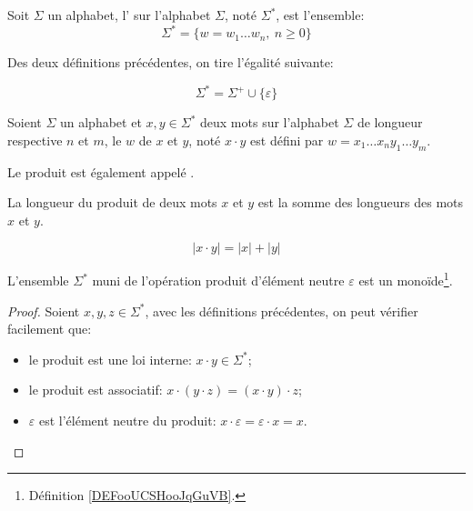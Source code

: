 \begin{definition}
	Soit \( \Sigma \) un alphabet, l' sur l'alphabet \( \Sigma \), noté \( \Sigma^* \), est l'ensemble:
	\begin{equation}
		\Sigma^* = \{ w = w_1 \ldots w_n,~ n \geq 0 \}
	\end{equation}
\end{definition}

Des deux définitions précédentes, on tire l'égalité suivante:

\begin{equation}
	\Sigma^* = \Sigma^+ \cup \{ \varepsilon \}
\end{equation}

\begin{definition}
	Soient \( \Sigma \) un alphabet et \( x, y \in \Sigma^* \) deux mots sur l'alphabet \( \Sigma \) de longueur respective \( n \) et \( m \), le  \( w \) de \( x \) et \( y \), noté \( x \cdot y \) est défini par \( w = x_1 \ldots x_n y_1 \ldots y_m \).
\end{definition}

Le produit est également appelé .

\begin{proposition}

	La longueur du produit de deux mots \( x \) et \( y \) est la somme des longueurs des mots \( x \) et \( y \).

	\begin{equation}
		|x \cdot y| = |x| + |y|
	\end{equation}
\end{proposition}


\begin{proposition}
	L'ensemble \( \Sigma^* \) muni de l'opération produit d'élément neutre \( \varepsilon \) est un monoïde\footnote{Définition \ref{DEFooUCSHooJqGuVB}.}.
\end{proposition}

\begin{proof}
	Soient \( x, y, z \in \Sigma^* \), avec les définitions précédentes, on peut vérifier facilement que:
	\begin{itemize}
		\item
		      le produit est une loi interne: \( x \cdot y \in \Sigma^*\);
		\item
		      le produit est associatif: \( x \cdot (y \cdot z) = (x \cdot y) \cdot z\);
		\item
		      \( \varepsilon\) est l'élément neutre du produit: \( x \cdot \varepsilon = \varepsilon \cdot x = x\).
	\end{itemize}
\end{proof}

